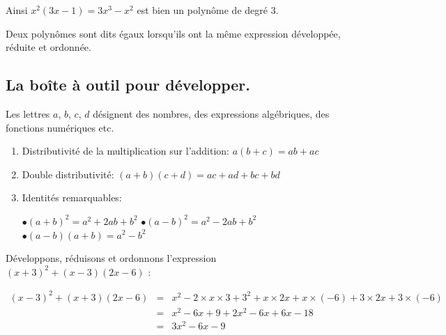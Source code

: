 \documentclass[a4paper,10pt]{report}
\begin{document}
\noindent Ainsi $x^2(3x-1)=3x^3-x^2$ est bien un polynôme de degré 3.

\begin{defn}
Deux polynômes sont dits égaux lorsqu'ils ont la même expression développée, réduite et ordonnée.
\end{defn}

\subsection{La boîte à outil pour développer.}

\begin{prop}
Les lettres $a$, $b$, $c$, $d$ désignent des nombres, des expressions algébriques, des fonctions numériques etc.
\begin{enumerate}
\item Distributivité de la multiplication sur l'addition: $a(b+c)= ab+ac$
\item Double distributivité: $(a+b)(c+d)= ac+ad+bc+bd$
\item Identités remarquables:

\vspace{-3mm}
\begin{center}
$\bullet (a+b)^2= a^2+2ab+b^2$ \hspace{1.5cm} $\bullet (a-b)^2= a^2-2ab+b^2$ \hspace{1.5cm} $\bullet (a-b)(a+b)=a^2-b^2$
\end{center}
\end{enumerate}
\end{prop}

\begin{ex}
Développons, réduisons et ordonnons l'expression $(x+3)^2 + (x-3)(2x-6)$ :

\begin{eqnarray*}
(x-3)^2 + (x+3)(2x-6)&=& x^2-2\times x \times 3 + 3^2 + x \times 2x + x \times (-6) + 3 \times 2x + 3 \times (-6)\\
&=& x^2-6x+9+2x^2 -6x +6x-18\\
&=& 3x^2 -6x -9 
\end{eqnarray*}
\end{ex}
\end{document}
